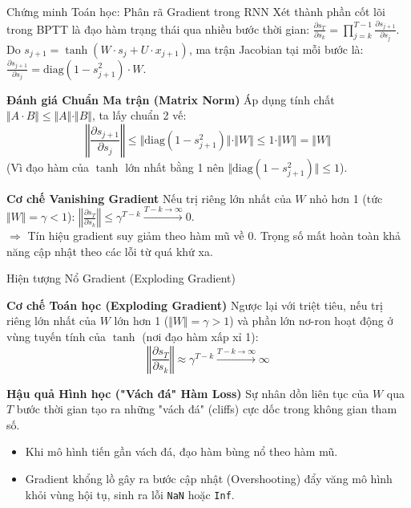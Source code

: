 \documentclass[aspectratio=169, 10pt]{beamer}
\begin{document}
\begin{frame}{Chứng minh Toán học: Phân rã Gradient trong RNN}
\footnotesize
Xét thành phần cốt lõi trong BPTT là đạo hàm trạng thái qua nhiều bước thời gian: $\frac{\partial s_T}{\partial s_k} = \prod_{j=k}^{T-1} \frac{\partial s_{j+1}}{\partial s_j}$.\\[0.1cm]
Do $s_{j+1} = \tanh(W \cdot s_j + U \cdot x_{j+1})$, ma trận Jacobian tại mỗi bước là: $\frac{\partial s_{j+1}}{\partial s_j} = \text{diag}(1 - s_{j+1}^2) \cdot W$.

\vspace{0.05cm}
\begin{block}{\textbf{Đánh giá Chuẩn Ma trận (Matrix Norm)}}
Áp dụng tính chất $\Vert A \cdot B \Vert \le \Vert A \Vert \cdot \Vert B \Vert$, ta lấy chuẩn 2 vế:
\[ \left\Vert \frac{\partial s_{j+1}}{\partial s_j} \right\Vert \le \Vert \text{diag}(1 - s_{j+1}^2) \Vert \cdot \Vert W \Vert \le 1 \cdot \Vert W \Vert = \Vert W \Vert \]
(Vì đạo hàm của $\tanh$ lớn nhất bằng 1 nên $\Vert \text{diag}(1 - s_{j+1}^2) \Vert \le 1$).
\end{block}

\vspace{0.05cm}
\begin{alertblock}{\textbf{Cơ chế Vanishing Gradient}}
Nếu trị riêng lớn nhất của $W$ nhỏ hơn 1 (tức $\Vert W \Vert = \gamma < 1$): $\left\Vert \frac{\partial s_T}{\partial s_k} \right\Vert \le \gamma^{T-k} \xrightarrow{T-k \to \infty} 0$.\\[0.1cm]
$\Rightarrow$ Tín hiệu gradient suy giảm theo hàm mũ về 0. Trọng số mất hoàn toàn khả năng cập nhật theo các lỗi từ quá khứ xa.
\end{alertblock}
\end{frame}

\begin{frame}{Hiện tượng Nổ Gradient (Exploding Gradient)}
\small
\begin{alertblock}{\textbf{Cơ chế Toán học (Exploding Gradient)}}
Ngược lại với triệt tiêu, nếu trị riêng lớn nhất của $W$ lớn hơn 1 ($\Vert W \Vert = \gamma > 1$) và phần lớn nơ-ron hoạt động ở vùng tuyến tính của $\tanh$ (nơi đạo hàm xấp xỉ 1):
\[ \left\Vert \frac{\partial s_T}{\partial s_k} \right\Vert \approx \gamma^{T-k} \xrightarrow{T-k \to \infty} \infty \]
\end{alertblock}

\vspace{0.1cm}
\begin{block}{\textbf{Hậu quả Hình học ("Vách đá" Hàm Loss)}}
Sự nhân dồn liên tục của $W$ qua $T$ bước thời gian tạo ra những "vách đá" (cliffs) cực dốc trong không gian tham số. 
\begin{itemize}
    \item Khi mô hình tiến gần vách đá, đạo hàm bùng nổ theo hàm mũ.
    \item Gradient khổng lồ gây ra bước cập nhật (Overshooting) đẩy văng mô hình khỏi vùng hội tụ, sinh ra lỗi \texttt{NaN} hoặc \texttt{Inf}.
\end{itemize}
\end{block}
\end{frame}
\end{document}
